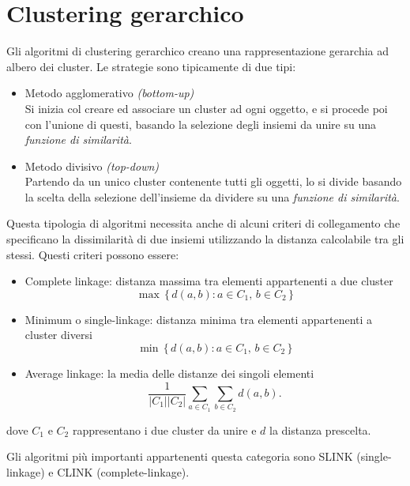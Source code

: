 \section{Clustering gerarchico}
	Gli algoritmi di clustering gerarchico creano una rappresentazione gerarchia ad albero dei cluster.
	Le strategie sono tipicamente di due tipi: 
	\begin{itemize}
		\item Metodo agglomerativo \emph{(bottom-up)} \\
		Si inizia col creare ed associare un cluster ad ogni oggetto, e si procede poi con l'unione di questi, basando la selezione degli insiemi da unire su una \emph{funzione di similarità}.

		\item Metodo divisivo \emph{(top-down)} \\
		Partendo da un unico cluster contenente tutti gli oggetti, lo si divide basando la scelta della selezione dell’insieme da dividere su una \emph{funzione di similarità}.
	\end{itemize}

	Questa tipologia di algoritmi necessita anche di alcuni criteri di collegamento che specificano la dissimilarità di due insiemi utilizzando la distanza calcolabile tra gli stessi. Questi criteri possono essere: 
	\begin{itemize}
		\item Complete linkage: distanza massima tra elementi appartenenti a due cluster
			\begin{equation*}
				\max \, \{\, d(a,b) : a \in C_1,\, b \in C_2 \,\}
			\end{equation*}
		\item Minimum o single-linkage: distanza minima tra elementi appartenenti a cluster diversi
			\begin{equation*}
			 	\min \, \{\, d(a,b) : a \in C_1,\, b \in C_2 \,\}
			\end{equation*}

		\item Average linkage: la media delle distanze dei singoli elementi
			\begin{equation*}
				\frac{1}{|C_1| |C_2|} \sum_{a \in C_1 }\sum_{ b \in C_2} d(a,b). 
			\end{equation*}
	\end{itemize}
	dove $C_1$ e $C_2$ rappresentano i due cluster da unire e $d$ la distanza prescelta.

	Gli algoritmi più importanti appartenenti questa categoria sono SLINK (single-linkage) e CLINK (complete-linkage)\cite{clustering_gerarchico}.
